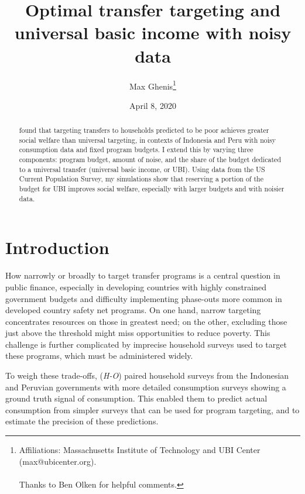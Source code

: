 \documentclass[12pt]{article}
\begin{document}
\begin{titlepage}
\title{Optimal transfer targeting and universal basic income with noisy data}
\author{Max Ghenis\thanks{Affiliations: Massachusetts Institute of Technology 
and UBI Center (max@ubicenter.org).
\protect \\
\protect \\Thanks to Ben Olken for helpful comments.
}}

\date{April 8, 2020}
\maketitle
\begin{abstract}
\noindent {} found that targeting transfers to households 
predicted to be poor achieves greater social welfare than universal targeting, 
in contexts of Indonesia and Peru with noisy consumption data and fixed program 
budgets. I extend this by varying three components: program budget, amount of 
noise, and the share of the budget dedicated to a universal transfer (universal 
basic income, or UBI). Using data from the US Current Population Survey, my 
simulations show that reserving a portion of the budget for UBI improves social 
welfare, especially with larger budgets and with noisier data.

\bigskip
\end{abstract}
\setcounter{page}{0}
\thispagestyle{empty}
\end{titlepage}
\pagebreak \newpage




\doublespacing


\section{Introduction} \label{sec:introduction}

How narrowly or broadly to target transfer programs is a central question
in public finance, especially in developing countries with highly constrained
government budgets and difficulty implementing phase-outs more common
in developed country safety net programs.
On one hand, narrow targeting concentrates resources on those in greatest need;
on the other, excluding those just above the threshold might miss opportunities
to reduce poverty.
This challenge is further complicated by imprecise household surveys used to
target these programs, which must be administered widely.

To weigh these trade-offs,  (\textit{H-O})
paired household surveys from the Indonesian and Peruvian governments with more 
detailed consumption surveys showing a ground truth signal of consumption.
This enabled them to predict actual consumption from simpler surveys that can
be used for program targeting,
and to estimate the precision of these predictions.
\end{document}
